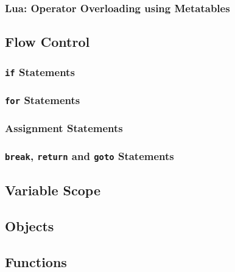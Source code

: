 \subsubsection{Lua: Operator Overloading using Metatables}

\subsection{Flow Control}
\subsubsection{\texttt{if} Statements}
\subsubsection{\texttt{for} Statements}
\subsubsection{Assignment Statements}
\subsubsection{\texttt{break}, \texttt{return} and \texttt{goto} Statements}

\subsection{Variable Scope}
\label{varscope}

\subsection{Objects}
\label{objects}

\subsection{Functions}
